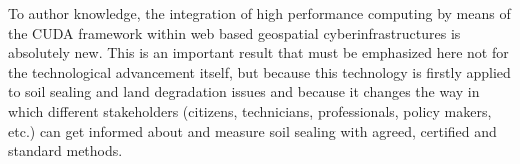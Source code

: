 \documentclass[APA,LATO1COL,doublespace]{WileyNJD-v2}
\newcommand{\toberevised}[1]{\emph{\textcolor{red}{#1}}} %
\begin{document}
To author knowledge, the
integration of high performance computing by means of the CUDA framework within web based geospatial cyberinfrastructures is absolutely new.
This is an important result that must be emphasized here not for the technological advancement itself, but because this technology is firstly applied to soil sealing and land degradation issues and because it changes the way in which different stakeholders (citizens, technicians, professionals, policy makers, etc.) can get informed about and measure soil sealing with agreed, certified and standard methods.

\end{document}
